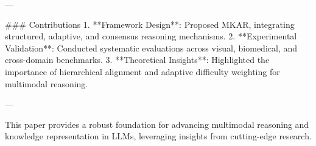---

### Contributions
1. **Framework Design**: Proposed MKAR, integrating structured, adaptive, and consensus reasoning mechanisms.
2. **Experimental Validation**: Conducted systematic evaluations across visual, biomedical, and cross-domain benchmarks.
3. **Theoretical Insights**: Highlighted the importance of hierarchical alignment and adaptive difficulty weighting for multimodal reasoning.

--- 

This paper provides a robust foundation for advancing multimodal reasoning and knowledge representation in LLMs, leveraging insights from cutting-edge research.